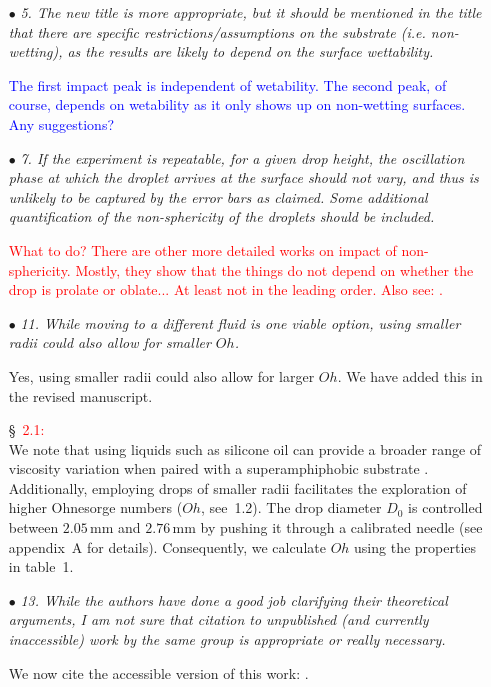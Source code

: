 \documentclass[]{article}
\newcommand*\blue{\textcolor{blue}}
\newcommand*\red{\textcolor{red}}
\newcommand{\oo}{\color{magenta} \normalfont}
\newcommand{\bb}{\color{black} \normalfont}
\begin{document}
\begin{enumerate}
	\item[$\bullet$] \textit{5. The new title is more appropriate, but it should be mentioned in the title that there are specific restrictions/assumptions on the substrate (i.e. non-wetting), as the results are likely to depend on the surface wettability.}
	
	\blue{The first impact peak is independent of wetability. The second peak, of course, depends on wetability as it only shows up on non-wetting surfaces. Any suggestions?}
	
	\item[$\bullet$] \textit{7. If the experiment is repeatable, for a given drop height, the oscillation phase at which the droplet arrives at the surface should not vary, and thus is unlikely to be captured by the error bars as claimed. Some additional quantification of the non-sphericity of the droplets should be included.}
	
	\red{What to do? There are other more detailed works on impact of non-sphericity. Mostly, they show that the things do not depend on whether the drop is prolate or oblate... At least not in the leading order. Also see: \citet{sanjay2023drop}.}
	
	\item[$\bullet$] \textit{11. While moving to a different fluid is one viable option, using smaller radii could also allow for smaller $Oh$.}
	
	Yes, using smaller radii could also allow for larger $Oh$. We have added this in the revised manuscript. 
	
	\S~\red{2.1:}\\
	\oo 
	We note that using liquids such as silicone oil can provide a broader range of viscosity variation when paired with a superamphiphobic substrate \citep{deng2012candle}. Additionally, employing drops of smaller radii facilitates the exploration of higher Ohnesorge numbers ($Oh$, see~1.2). 
	The drop diameter $D_0$ is controlled between $2.05\,\si{\milli\meter}$ and $2.76\,\si{\milli\meter}$ by pushing it through a calibrated needle (see appendix~A for details). 
	Consequently, we calculate $Oh$ using the properties in table~1.\bb
	
	\item[$\bullet$] \textit{13. While the authors have done a good job clarifying their theoretical arguments, I am not sure that citation to unpublished (and currently inaccessible) work by the same group is appropriate or really necessary.}
	
	We now cite the accessible version of this work: \citet{sanjay2024PRL}.
	
\end{enumerate}
\end{document}

